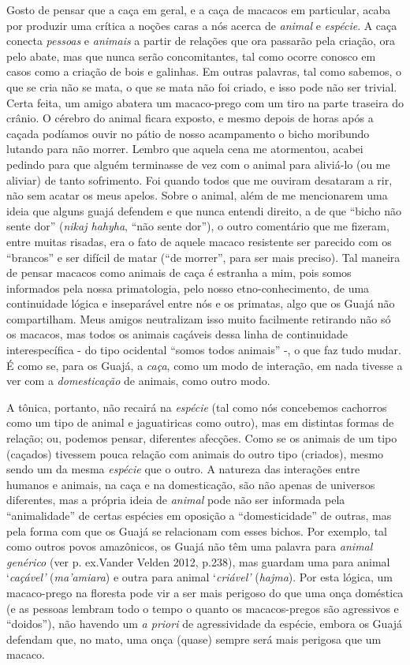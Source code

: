Gosto de pensar que a caça em geral, e a caça de macacos em particular,
acaba por produzir uma crítica a noções caras a nós acerca de
\emph{animal} e \emph{espécie}. A caça conecta \emph{pessoas} e
\emph{animais} a partir de relações que ora passarão pela criação, ora
pelo abate, mas que nunca serão concomitantes, tal como ocorre conosco
em casos como a criação de bois e galinhas. Em outras palavras, tal como
sabemos, o que se cria não se mata, o que se mata não foi criado, e isso
pode não ser trivial. Certa feita, um amigo abatera um macaco-prego com
um tiro na parte traseira do crânio. O cérebro do animal ficara exposto,
e mesmo depois de horas após a caçada podíamos ouvir no pátio de nosso
acampamento o bicho moribundo lutando para não morrer. Lembro que aquela
cena me atormentou, acabei pedindo para que alguém terminasse de vez com
o animal para aliviá-lo (ou me aliviar) de tanto sofrimento. Foi quando
todos que me ouviram desataram a rir, não sem acatar os meus apelos.
Sobre o animal, além de me mencionarem uma ideia que alguns guajá
defendem e que nunca entendi direito, a de que ``bicho não sente dor''
(\emph{nikaj hahyha}, ``não sente dor''), o outro comentário que me
fizeram, entre muitas risadas, era o fato de aquele macaco resistente
ser parecido com os ``brancos'' e ser difícil de matar (``de morrer'',
para ser mais preciso). Tal maneira de pensar macacos como animais de
caça é estranha a mim, pois somos informados pela nossa primatologia,
pelo nosso etno-conhecimento, de uma continuidade lógica e inseparável
entre nós e os primatas, algo que os Guajá não compartilham. Meus amigos
neutralizam isso muito facilmente retirando não só os macacos, mas todos
os animais caçáveis dessa linha de continuidade interespecífica - do
tipo ocidental ``somos todos animais'' -, o que faz tudo mudar. É como
se, para os Guajá, a \emph{caça}, como um modo de interação, em nada
tivesse a ver com a \emph{domesticação} de animais, como outro modo.

A tônica, portanto, não recairá na \emph{espécie} (tal como nós
concebemos cachorros como um tipo de animal e jaguatiricas como outro),
mas em distintas formas de relação; ou, podemos pensar, diferentes
afecções. Como se os animais de um tipo (caçados) tivessem pouca relação
com animais do outro tipo (criados), mesmo sendo um da mesma
\emph{espécie} que o outro. A natureza das interações entre humanos e
animais, na caça e na domesticação, são não apenas de universos
diferentes, mas a própria ideia de \emph{animal} pode não ser informada
pela ``animalidade'' de certas espécies em oposição a ``domesticidade''
de outras, mas pela forma com que os Guajá se relacionam com esses
bichos. Por exemplo, tal como outros povos amazônicos, os Guajá não têm
uma palavra para \emph{animal} \emph{genérico} (ver p. ex.Vander Velden
2012, p.238), mas guardam uma para animal `\emph{caçável'}
(\emph{ma'amiara}) e outra para animal `\emph{criável'} (\emph{hajma}).
Por esta lógica, um macaco-prego na floresta pode vir a ser mais
perigoso do que uma onça doméstica (e as pessoas lembram todo o tempo o
quanto os macacos-pregos são agressivos e ``doidos''), não havendo um
\emph{a priori} de agressividade da espécie, embora os Guajá defendam
que, no mato, uma onça (quase) sempre será mais perigosa que um macaco.

